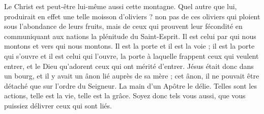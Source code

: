  Le Christ est peut-être lui-même aussi cette montagne. Quel autre que lui, produirait en effet une telle moisson d’oliviers ? non pas de ces oliviers qui ploient sous l’abondance de leurs fruits, mais de ceux qui prouvent leur fécondité en communiquant aux nations la plénitude du Saint-Esprit. Il est celui par qui nous montons et vers qui nous montons. Il est la porte et il est la voie ; il est la porte qui s’ouvre et il est celui qui l’ouvre, la porte à laquelle frappent ceux qui veulent entrer, et le Dieu qu’adorent ceux qui ont mérité d’entrer. Jésus était donc dans un bourg, et il y avait un ânon lié auprès de sa mère ; cet ânon, il ne pouvait être détaché que sur l’ordre du Seigneur. La main d’un Apôtre le délie. Telles sont les actions, telle est la vie, telle est la grâce. Soyez donc tels vous aussi, que vous puissiez délivrer ceux qui sont liés.